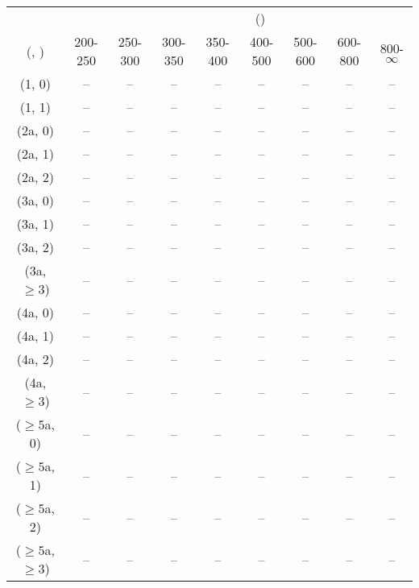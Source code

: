 \begin{table}[h!]
\tiny
\centering
{}
\begin{tabular}
{ccccccccc}
	\hline\hline
&	& \multicolumn{8}{c}{\scalht (\gev)} \\ 
	 (\njet,  \nb) & 200-250 & 250-300 & 300-350 & 350-400 & 400-500 & 500-600 & 600-800 & 800-$\infty$ \\ [0.8ex] 
\hline
	(1, 0) & -- & -- & -- & -- & -- & -- & -- & -- \\[0.5ex] 
	(1, 1) & -- & -- & -- & -- & -- & -- & -- & -- \\[0.5ex] 
	(2a, 0) & -- & -- & -- & -- & -- & -- & -- & -- \\[0.5ex] 
	(2a, 1) & -- & -- & -- & -- & -- & -- & -- & -- \\[0.5ex] 
	(2a, 2) & -- & -- & -- & -- & -- & -- & -- & -- \\[0.5ex] 
	(3a, 0) & -- & -- & -- & -- & -- & -- & -- & -- \\[0.5ex] 
	(3a, 1) & -- & -- & -- & -- & -- & -- & -- & -- \\[0.5ex] 
	(3a, 2) & -- & -- & -- & -- & -- & -- & -- & -- \\[0.5ex] 
	(3a, $\ge3$) & -- & -- & -- & -- & -- & -- & -- & -- \\[0.5ex] 
	(4a, 0) & -- & -- & -- & -- & -- & -- & -- & -- \\[0.5ex] 
	(4a, 1) & -- & -- & -- & -- & -- & -- & -- & -- \\[0.5ex] 
	(4a, 2) & -- & -- & -- & -- & -- & -- & -- & -- \\[0.5ex] 
	(4a, $\ge3$) & -- & -- & -- & -- & -- & -- & -- & -- \\[0.5ex] 
	($\ge5$a, 0) & -- & -- & -- & -- & -- & -- & -- & -- \\[0.5ex] 
	($\ge5$a, 1) & -- & -- & -- & -- & -- & -- & -- & -- \\[0.5ex] 
	($\ge5$a, 2) & -- & -- & -- & -- & -- & -- & -- & -- \\[0.5ex] 
	($\ge5$a, $\ge3$) & -- & -- & -- & -- & -- & -- & -- & -- \\[0.5ex] 
	\hline
	\hline
\end{tabular}
\end{table}
